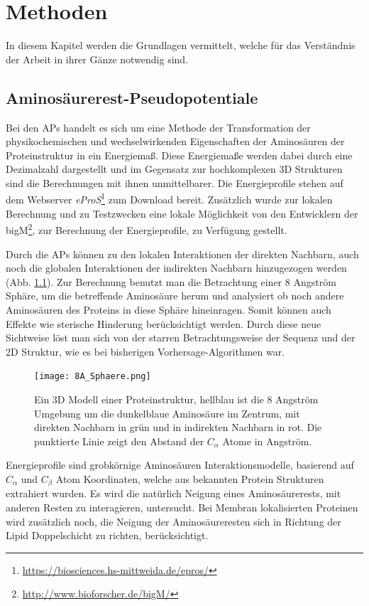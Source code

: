 \chapter{Methoden}

In diesem Kapitel werden die Grundlagen vermittelt, welche für das Verständnis der Arbeit in ihrer Gänze notwendig sind.

\section{Aminosäurerest-Pseudopotentiale}

Bei den \acf{APs} handelt es sich um eine Methode der Transformation der physikochemischen und wechselwirkenden Eigenschaften der Aminosäuren der Proteinstruktur in ein Energiemaß. Diese Energiemaße werden dabei durch eine Dezimalzahl dargestellt und im Gegensatz zur hochkomplexen 3D Strukturen sind die Berechnungen mit ihnen unmittelbarer. Die Energieprofile stehen auf dem Webserver \emph{eProS}\footnote{\url{https://biosciences.hs-mittweida.de/epros/}} zum Download bereit. Zusätzlich wurde zur lokalen Berechnung und zu Testzwecken eine lokale Möglichkeit von den Entwicklern der \ac{bigM}\footnote{\url{http://www.bioforscher.de/bigM/}}, zur Berechnung der Energieprofile, zu Verfügung gestellt.

Durch die \ac{APs} können zu den lokalen Interaktionen der direkten Nachbarn, auch noch die globalen Interaktionen der indirekten Nachbarn hinzugezogen werden (Abb. \ref{fig:8A_Sphaere}). Zur Berechnung benutzt man die Betrachtung einer 8 Angström Sphäre, um die betreffende Aminosäure herum und analysiert ob noch andere Aminosäuren des Proteins in diese Sphäre hineinragen. Somit können auch Effekte wie sterische Hinderung berücksichtigt werden. Durch diese neue Sichtweise löst man sich von der starren Betrachtungsweise der Sequenz und der 2D Struktur, wie es bei bisherigen Vorhersage-Algorithmen war.
%
\begin{figure}
\centering
\texttt{[image: 8A\_Sphaere.png]}
\caption{Ein 3D Modell einer Proteinstruktur, hellblau ist die 8 Angström Umgebung um die dunkelblaue Aminosäure im Zentrum, mit direkten Nachbarn in grün und in indirekten Nachbarn in rot. Die punktierte Linie zeigt den Abstand der $C_{\alpha}$ Atome in Angström.}%
\label{fig:8A_Sphaere}
\end{figure}

Energieprofile sind grobkörnige Aminosäuren Interaktionsmodelle, basierend auf $C_{\alpha}$ und $C_{\beta}$ Atom Koordinaten, welche aus bekannten Protein Strukturen extrahiert wurden. Es wird die natürlich Neigung eines Aminosäurerests, mit anderen Resten zu interagieren, untersucht. Bei Membran lokalisierten Proteinen wird zusätzlich noch, die Neigung der Aminosäureresten sich in Richtung der Lipid Doppelschicht zu richten, berücksichtigt. 

